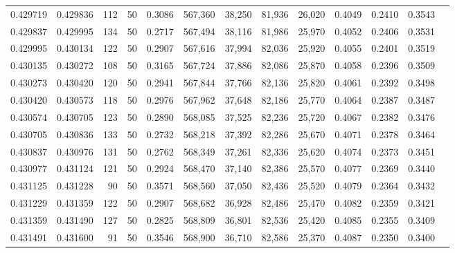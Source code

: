 \begin{tabular}{rrrrrrrrrrrrr}
0.429719 & 0.429836 &   112 &  50 &                                     0.3086 & 567,360 &  38,250 &  81,936 &  26,020 & 0.4049 & 0.2410 & 0.3543 \\
0.429837 & 0.429995 &   134 &  50 &                                     0.2717 & 567,494 &  38,116 &  81,986 &  25,970 & 0.4052 & 0.2406 & 0.3531 \\
0.429995 & 0.430134 &   122 &  50 &                                     0.2907 & 567,616 &  37,994 &  82,036 &  25,920 & 0.4055 & 0.2401 & 0.3519 \\
0.430135 & 0.430272 &   108 &  50 &                                     0.3165 & 567,724 &  37,886 &  82,086 &  25,870 & 0.4058 & 0.2396 & 0.3509 \\
0.430273 & 0.430420 &   120 &  50 &                                     0.2941 & 567,844 &  37,766 &  82,136 &  25,820 & 0.4061 & 0.2392 & 0.3498 \\
0.430420 & 0.430573 &   118 &  50 &                                     0.2976 & 567,962 &  37,648 &  82,186 &  25,770 & 0.4064 & 0.2387 & 0.3487 \\
0.430574 & 0.430705 &   123 &  50 &                                     0.2890 & 568,085 &  37,525 &  82,236 &  25,720 & 0.4067 & 0.2382 & 0.3476 \\
0.430705 & 0.430836 &   133 &  50 &                                     0.2732 & 568,218 &  37,392 &  82,286 &  25,670 & 0.4071 & 0.2378 & 0.3464 \\
0.430837 & 0.430976 &   131 &  50 &                                     0.2762 & 568,349 &  37,261 &  82,336 &  25,620 & 0.4074 & 0.2373 & 0.3451 \\
0.430977 & 0.431124 &   121 &  50 &                                     0.2924 & 568,470 &  37,140 &  82,386 &  25,570 & 0.4077 & 0.2369 & 0.3440 \\
0.431125 & 0.431228 &    90 &  50 &                                     0.3571 & 568,560 &  37,050 &  82,436 &  25,520 & 0.4079 & 0.2364 & 0.3432 \\
0.431229 & 0.431359 &   122 &  50 &                                     0.2907 & 568,682 &  36,928 &  82,486 &  25,470 & 0.4082 & 0.2359 & 0.3421 \\
0.431359 & 0.431490 &   127 &  50 &                                     0.2825 & 568,809 &  36,801 &  82,536 &  25,420 & 0.4085 & 0.2355 & 0.3409 \\
0.431491 & 0.431600 &    91 &  50 &                                     0.3546 & 568,900 &  36,710 &  82,586 &  25,370 & 0.4087 & 0.2350 & 0.3400 \\

\end{tabular}
